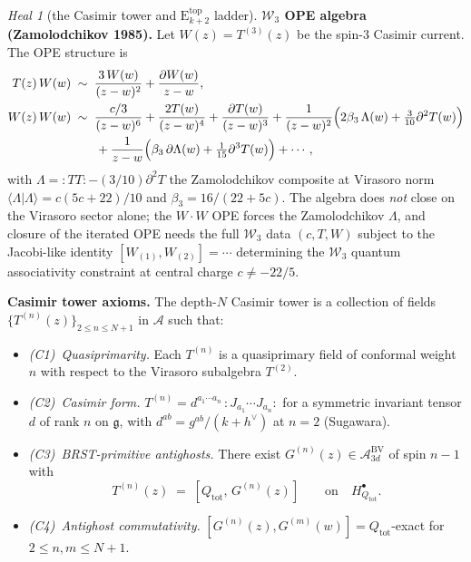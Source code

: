 \documentclass{article}
\theoremstyle{definition}
\theoremstyle{remark}
\newtheorem{heal}[theorem]{Heal}
\newcommand{\Etop}[1]{\mathrm{E}_{#1}^{\mathrm{top}}}
\newcommand{\fg}{\mathfrak{g}}
\newcommand{\cW}{\mathcal{W}}
\newcommand{\cA}{\mathcal{A}}
\newcommand{\hv}{h^{\vee}}
\newcommand{\nord}[1]{{:}#1{:}}
\begin{document}
\begin{heal}[the Casimir tower and $\Etop{k+2}$ ladder]
\textbf{$\cW_3$ OPE algebra (Zamolodchikov 1985).} Let
$W(z) = T^{(3)}(z)$ be the spin-$3$ Casimir current. The OPE structure
is
\begin{align}\label{eq:w3-ope}
 T(z)\, W(w) &\;\sim\; \frac{3\,W(w)}{(z-w)^2}
 + \frac{\partial W(w)}{z-w}, \\
 W(z)\, W(w) &\;\sim\; \frac{c/3}{(z-w)^6}
 + \frac{2T(w)}{(z-w)^4}
 + \frac{\partial T(w)}{(z-w)^3}
 + \frac{1}{(z-w)^2}\Bigl(2\beta_3\,\Lambda(w)
 + \tfrac{3}{10}\partial^2 T(w)\Bigr) \notag \\
 & \qquad + \frac{1}{z-w}\Bigl(\beta_3\,\partial\Lambda(w)
 + \tfrac{1}{15}\partial^3 T(w)\Bigr) + \cdots,
\end{align}
with $\Lambda = \nord{TT} - (3/10)\partial^2 T$ the Zamolodchikov
composite at Virasoro norm $\langle \Lambda | \Lambda \rangle
= c(5c+22)/10$ and
$\beta_3 = 16/(22 + 5c)$. The algebra does \emph{not} close on the
Virasoro sector alone; the $W\cdot W$ OPE forces the Zamolodchikov
$\Lambda$, and closure of the iterated OPE needs the full $\cW_3$
data $(c, T, W)$ subject to the Jacobi-like identity
$[W_{(1)}, W_{(2)}] = \cdots$ determining the $\cW_3$ quantum
associativity constraint at central charge $c \neq -22/5$.

\textbf{Casimir tower axioms.}
The depth-$N$ Casimir tower is a collection of fields
$\{T^{(n)}(z)\}_{2\leq n \leq N+1}$ in $\cA$ such that:
\begin{itemize}
\item \emph{(C1)~Quasiprimarity.} Each $T^{(n)}$ is a quasiprimary
field of conformal weight $n$ with respect to the Virasoro
subalgebra $T^{(2)}$.
\item \emph{(C2)~Casimir form.} $T^{(n)} = d^{a_1\cdots a_n}\,
\nord{J_{a_1}\cdots J_{a_n}}$ for a symmetric invariant tensor
$d$ of rank $n$ on $\fg$, with $d^{ab} = g^{ab}/(k+\hv)$ at
$n = 2$ (Sugawara).
\item \emph{(C3)~BRST-primitive antighosts.} There exist
$G^{(n)}(z) \in \cA^{\mathrm{BV}}_{3d}$ of spin $n-1$ with
\begin{equation}\label{eq:Gn-BRST}
 T^{(n)}(z) \;=\; [Q_{\mathrm{tot}},\, G^{(n)}(z)]
 \qquad\text{on}\quad H^{\bullet}_{Q_{\mathrm{tot}}}.
\end{equation}
\item \emph{(C4)~Antighost commutativity.}
$[G^{(n)}(z), G^{(m)}(w)] = Q_{\mathrm{tot}}$-exact for
$2 \leq n,m \leq N+1$.
\end{itemize}


\end{heal}
\end{document}

